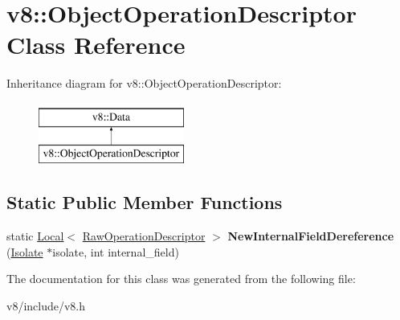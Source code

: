 \hypertarget{classv8_1_1ObjectOperationDescriptor}{}\section{v8\+:\+:Object\+Operation\+Descriptor Class Reference}
\label{classv8_1_1ObjectOperationDescriptor}
Inheritance diagram for v8\+:\+:Object\+Operation\+Descriptor\+:\begin{figure}[H]
\begin{center}
\leavevmode
\includegraphics[height=2.000000cm]{classv8_1_1ObjectOperationDescriptor}
\end{center}
\end{figure}
\subsection*{Static Public Member Functions}
\begin{DoxyCompactItemize}
\item 
\hypertarget{classv8_1_1ObjectOperationDescriptor_a5268ef439fd9f47190ccaecfd721aa12}{}static \hyperlink{classv8_1_1Local}{Local}$<$ \hyperlink{classv8_1_1RawOperationDescriptor}{Raw\+Operation\+Descriptor} $>$ {\bfseries New\+Internal\+Field\+Dereference} (\hyperlink{classv8_1_1Isolate}{Isolate} $\ast$isolate, int internal\+\_\+field)\label{classv8_1_1ObjectOperationDescriptor_a5268ef439fd9f47190ccaecfd721aa12}

\end{DoxyCompactItemize}


The documentation for this class was generated from the following file\+:\begin{DoxyCompactItemize}
\item 
v8/include/v8.\+h\end{DoxyCompactItemize}
